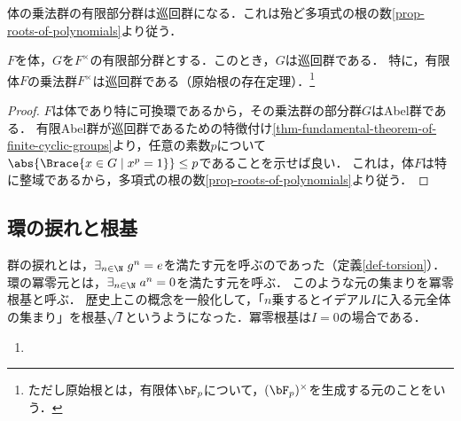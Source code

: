 \documentclass[uplatex,dvipdfmx]{jsreport}
\begin{document}
\begin{tcolorbox}[colframe=ForestGreen, colback=ForestGreen!10!white,breakable,colbacktitle=ForestGreen!40!white,coltitle=black,fonttitle=\bfseries\sffamily,
title=]
    体の乗法群の有限部分群は巡回群になる．これは殆ど多項式の根の数\ref{prop-roots-of-polynomials}より従う．
\end{tcolorbox}

\begin{proposition}
    $F$を体，$G$を$F^\times$の有限部分群とする．このとき，$G$は巡回群である．
    特に，有限体$F$の乗法群$F^\times$は巡回群である（原始根の存在定理）．\footnote{ただし原始根とは，有限体$\bF_p$について，$(\bF_p)^\times$を生成する元のことをいう．}
\end{proposition}
\begin{proof}
    $F$は体であり特に可換環であるから，その乗法群の部分群$G$はAbel群である．
    有限Abel群が巡回群であるための特徴付け\ref{thm-fundamental-theorem-of-finite-cyclic-groups}より，任意の素数$p$について$\abs{\Brace{x\in G\mid x^p=1}}\le p$であることを示せば良い．
    これは，体$F$は特に整域であるから，多項式の根の数\ref{prop-roots-of-polynomials}より従う．
\end{proof}

\subsection{環の捩れと根基}

\begin{tcolorbox}[colframe=ForestGreen, colback=ForestGreen!10!white,breakable,colbacktitle=ForestGreen!40!white,coltitle=black,fonttitle=\bfseries\sffamily,
title=]
    群の捩れとは，$\exists_{n\in\N}\;g^n=e$を満たす元を呼ぶのであった（定義\ref{def-torsion}）．
    環の冪零元とは，$\exists_{n\in\N}\;a^n=0$を満たす元を呼ぶ．
    このような元の集まりを冪零根基と呼ぶ．
    歴史上この概念を一般化して，「$n$乗するとイデアル$I$に入る元全体の集まり」を根基$\sqrt{I}$というようになった．冪零根基は$I=0$の場合である．
\end{tcolorbox}

\begin{definition}[radical]\mbox{}
    \begin{enumerate}
        \item 
    \end{enumerate}
\end{definition}
\end{document}
